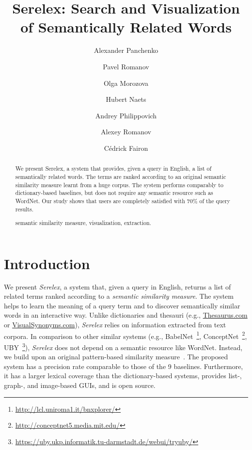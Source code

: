 \documentclass[runningheads,a4paper]{llncs}
\newcommand{\keywords}[1]{\par\addvspace\baselineskip
\noindent\keywordname\enspace\ignorespaces#1}
\begin{document}
\mainmatter  

\title{Serelex: Search and Visualization of Semantically Related Words}


\author{Alexander Panchenko \and Pavel Romanov \and Olga Morozova \and Hubert Naets \and Andrey Philippovich \and Alexey Romanov \and C\'{e}drick Fairon}




\toctitle{ \ldots } 
\tocauthor{ \ldots }
\maketitle

\begin{abstract}

We present Serelex, a system that provides, given a query in English, a list of semantically related words. The terms are ranked according to an original semantic similarity measure learnt from a huge corpus. The system performs comparably to dictionary-based baselines, but does not require any semantic resource such as WordNet. Our study shows that users are completely satisfied with  70\% of the query results.     


\keywords{ semantic similarity measure, visualization, extraction.}
\end{abstract}


\section{Introduction}

We present \textit{Serelex}, a system that, given a query in English, returns a list of related terms ranked according to a \textit{semantic similarity measure}. The system helps to learn the meaning of a query term and to discover semantically similar words in an interactive way. Unlike dictionaries and thesauri (e.g., \url{Thesaurus.com} or \url{VisualSynonyms.com}), \textit{Serelex} relies on information extracted from text corpora. In comparison to other similar systems (e.g., BabelNet~\footnote{ \url{http://lcl.uniroma1.it/bnxplorer/}}, ConceptNet~\footnote{ \url{http://conceptnet5.media.mit.edu/}}, UBY~\footnote{\url{https://uby.ukp.informatik.tu-darmstadt.de/webui/tryuby/}}), \textit{Serelex} does not depend on a semantic resource like WordNet. Instead, we build upon an original pattern-based similarity measure~\cite{panchenko2012konvens}. The proposed system
has a precision rate comparable to those of the 9 baselines. Furthermore, it has a larger lexical coverage than the dictionary-based systems, provides list-, graph-, and image-based GUIs, and is open source. 
\end{document}
